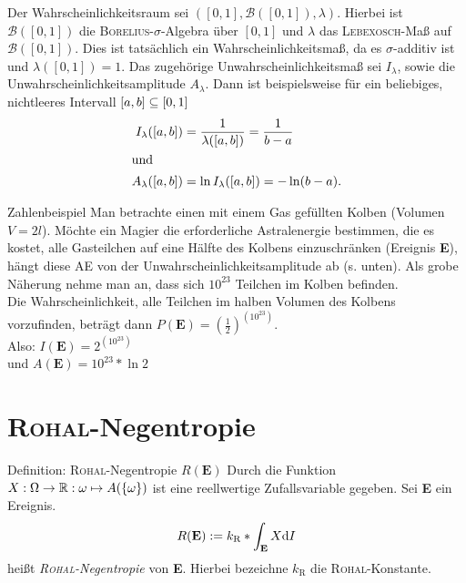 \begin{bsp}
Der Wahrscheinlichkeitsraum sei $([0,1],\mathcal{B}([0,1]),\lambda)$. Hierbei ist $\mathcal{B}([0,1])$ die \textsc{Borelius}-$\sigma$-Algebra über $[0,1]$ und $\lambda$ das \textsc{Lebexosch}-Maß auf $\mathcal{B}([0,1])$. Dies ist tatsächlich ein Wahrscheinlichkeitsmaß, da es $\sigma$-additiv ist und $\lambda([0,1])=1$. Das zugehörige Unwahrscheinlichkeitsmaß sei $I_\lambda$, sowie die Unwahrscheinlichkeitsamplitude $A_\lambda$. Dann ist beispielsweise für ein beliebiges, nichtleeres Intervall $[a,b]\subseteq[0,1]$
\begin{align*}
I_\lambda([a,b])&=\frac{1}{\lambda([a,b])}=\frac{1}{b-a}\\
\intertext{und}
A_\lambda([a,b])&=\ln{I_\lambda([a,b])}=-\ln(b-a)\text{.}
\end{align*}
\end{bsp}
\begin{bla}{Zahlenbeispiel}
Man betrachte einen mit einem Gas gefüllten Kolben (Volumen $V = 2l$). Möchte ein Magier die erforderliche Astralenergie bestimmen, die es kostet, alle Gasteilchen auf eine Hälfte des Kolbens einzuschränken (Ereignis \textbf{E}), hängt diese AE von der Unwahrscheinlichkeitsamplitude ab (s. unten). Als grobe Näherung nehme man an, dass sich $10^{23}$ Teilchen im Kolben befinden.\\ Die Wahrscheinlichkeit, alle Teilchen im halben Volumen des Kolbens vorzufinden, beträgt dann $P(\textbf{E}) = (\frac{1}{2})^{(10^{23})}$. \\
Also: $I(\textbf{E}) = 2^{(10^{23})}$ \\
und $A(\textbf{E}) = 10 ^{23} * \ln 2$
\end{bla}

\section{\textsc{Rohal}-Negentropie}
\begin{bla}{Definition: \textsc{Rohal}-Negentropie $R(\textbf{E})$}
Durch die Funktion $X: \Omega\to\mathbb{R}: \omega\mapsto A(\{\omega\})$ ist eine reellwertige Zufallsvariable gegeben. Sei \textbf{E} ein Ereignis.
\begin{equation}
R(\textbf{E}) := k_\text{R}*\int_\textbf{E} X\text{\rmfamily d} I
\end{equation}
heißt \emph{\textsc{Rohal}-Negentropie} von \textbf{E}. Hierbei bezeichne $k_\text{R}$ die \textsc{Rohal}-Konstante.
\end{bla}